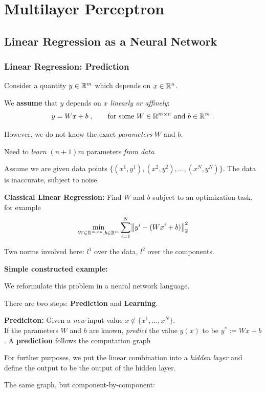\documentclass[10pt,hyperref={pdfpagelabels=false}]{beamer}
\begin{document}
\section{Multilayer Perceptron}
\subsection{Linear Regression as a Neural Network}
\begin{frame}[allowframebreaks]
    \frametitle{Linear Regression: Prediction}
    \begin{itemize}
        \item Consider a quantity $y\in \mathbb{R}^m$ which depends on $x\in\mathbb{R}^n$.
        \item We {\bf assume} that $y$ depends on $x$ \emph{linearly or affinely}:
        $$
        y = Wx + b\;,
        \qquad \text{for some } W\in\mathbb{R}^{m\times n} \text{ and } b\in \mathbb{R}^m
        \;.
        $$
        \item However, we do not know the exact \emph{parameters} $W$ and $b$.
        \item Need to \emph{learn} $(n+1)m$ parameters \emph{from data}.
        \item Assume we are given data points $\{(x^1, y^1), (x^2, y^2), \dots, (x^N, y^N)\}$. The data is inaccurate, subject to noise.
        \item {\bf Classical Linear Regression:} Find $W$ and $b$ subject to an optimization task, for example
        $$\min_{W\in \R^{m\times n}, b\in \R^m} \sum_{i=1}^N\left\|y^i-(Wx^i+b)\right\|_2^2$$
        {\small
        \item Two norms involved here: $l^1$ over the data, $l^2$ over the components.
        }
        \framebreak
        \item {\bf Simple constructed example:}
        
        \framebreak
        \item We reformulate this problem in a neural network language.
        \item There are two steps: {\bf Prediction} and {\bf Learning}.
        \item {\bf Prediciton:} Given a \emph{new} input value $x\not\in\{x^1,\dots,x^N\}$. \\
        If the parameters $W$ and $b$ are known, \emph{predict} the value $y(x)$ to be $y^\ast:=Wx+b$.
        A {\bf prediction} follows the computation graph\\[1em]
        
        \item For further purposes, we put the linear combination into a \emph{hidden layer} and define the output to be the output of the hidden layer.
        \framebreak
        \item The same graph, but component-by-component:
        


\end{itemize}
\end{frame}
\end{document}
